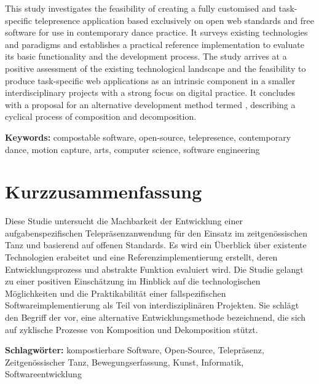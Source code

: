 
This study investigates the feasibility of creating a fully customised and task-specific telepresence application based exclusively on open web standards and free software for use in contemporary dance practice.
It surveys existing technologies and paradigms and establishes a practical reference implementation to evaluate its basic functionality and the development process.
The study arrives at a positive assessment of the existing technological landscape and the feasibility to produce task-specific web applications as an intrinsic component in a smaller interdisciplinary projects with a strong focus on digital practice.
It concludes with a proposal for an alternative development method termed , describing a cyclical process of composition and decomposition.

\textbf{Keywords:} compostable software, open-source, telepresence, contemporary dance, motion capture, arts, computer science, software engineering


\section*{Kurzzusammenfassung}

Diese Studie untersucht die Machbarkeit der Entwicklung einer aufgabenspezifischen Telepräsenzanwendung für den Einsatz im zeitgenössischen Tanz und basierend auf offenen Standards.
Es wird ein Überblick über existente Technologien erabeitet und eine Referenzimplementierung erstellt, deren Entwicklungsprozess und abstrakte Funktion evaluiert wird.
Die Studie gelangt zu einer positiven Einschätzung im Hinblick auf die technologischen Möglichkeiten und die Praktikabilität einer fallspezifischen Softwareimplementierung als Teil von interdisziplinären Projekten.
Sie schlägt den Begriff der  vor, eine alternative Entwicklungsmethode bezeichnend, die sich auf zyklische Prozesse von Komposition und Dekomposition stützt.
 
 \textbf{Schlagwörter:} kompostierbare Software, Open-Source, Telepräsenz, Zeitgenössischer Tanz, Bewegungserfassung, Kunst, Informatik, Softwareentwicklung
 